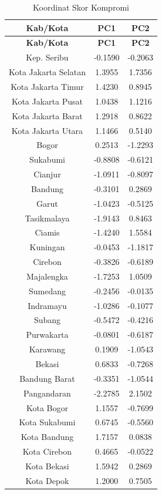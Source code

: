 \begin{longtable}{|c|c|c|}
\caption{Koordinat Skor Kompromi} \label{tab:scores} \\
\hline
\textbf{Kab/Kota} & \textbf{PC1} & \textbf{PC2} \\
\hline
\endfirsthead
\hline
\textbf{Kab/Kota} & \textbf{PC1} & \textbf{PC2} \\
\hline
\endhead
\hline
\endfoot
Kep. Seribu & -0.1590 & -0.2063 \\
Kota Jakarta Selatan & 1.3955 & 1.7356 \\
Kota Jakarta Timur & 1.4230 & 0.8945 \\
Kota Jakarta Pusat & 1.0438 & 1.1216 \\
Kota Jakarta Barat & 1.2918 & 0.8622 \\
Kota Jakarta Utara & 1.1466 & 0.5140 \\
Bogor & 0.2513 & -1.2293 \\
Sukabumi & -0.8808 & -0.6121 \\
Cianjur & -1.0911 & -0.8097 \\
Bandung & -0.3101 & 0.2869 \\
Garut & -1.0423 & -0.5125 \\
Tasikmalaya & -1.9143 & 0.8463 \\
Ciamis & -1.4240 & 1.5584 \\
Kuningan & -0.0453 & -1.1817 \\
Cirebon & -0.3826 & -0.6189 \\
Majalengka & -1.7253 & 1.0509 \\
Sumedang & -0.2456 & -0.0135 \\
Indramayu & -1.0286 & -0.1077 \\
Subang & -0.5472 & -0.4216 \\
Purwakarta & -0.0801 & -0.6187 \\
Karawang & 0.1909 & -1.0543 \\
Bekasi & 0.6833 & -0.7268 \\
Bandung Barat & -0.3351 & -1.0544 \\
Pangandaran & -2.2785 & 2.1502 \\
Kota Bogor & 1.1557 & -0.7699 \\
Kota Sukabumi & 0.6745 & -0.5560 \\
Kota Bandung & 1.7157 & 0.0838 \\
Kota Cirebon & 0.4665 & -0.0522 \\
Kota Bekasi & 1.5942 & 0.2869 \\
Kota Depok & 1.2000 & 0.7505 \\

\end{longtable}
